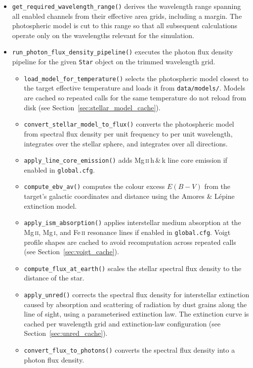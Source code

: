\noindent
\begin{itemize}
    \item \texttt{get\_required\_wavelength\_range()} derives the wavelength range spanning all enabled channels from their effective area grids, including a margin. The photospheric model is cut to this range so that all subsequent calculations operate only on the wavelengths relevant for the simulation.

    \item \texttt{run\_photon\_flux\_density\_pipeline()} executes the photon flux density pipeline for the given \texttt{Star} object on the trimmed wavelength grid.
          \begin{itemize}
              \item \texttt{load\_model\_for\_temperature()} selects the photospheric model closest to the target effective temperature and loads it from \texttt{data/models/}. Models are cached so repeated calls for the same temperature do not reload from disk (see Section~\ref{sec:stellar_model_cache}).
              \item \texttt{convert\_stellar\_model\_to\_flux()} converts the photospheric model from spectral flux density per unit frequency to per unit wavelength, integrates over the stellar sphere, and integrates over all directions.
              \item \texttt{apply\_line\_core\_emission()} adds Mg\,\textsc{ii}\,h\,\&\,k line core emission if enabled in \texttt{global.cfg}.
              \item \texttt{compute\_ebv\_av()} computes the colour excess $E(B-V)$ from the target's galactic coordinates and distance using the Amores \& Lépine extinction model.
              \item \texttt{apply\_ism\_absorption()} applies interstellar medium absorption at the Mg\,\textsc{ii}, Mg\,\textsc{i}, and Fe\,\textsc{ii} resonance lines if enabled in \texttt{global.cfg}. Voigt profile shapes are cached to avoid recomputation across repeated calls (see Section~\ref{sec:voigt_cache}).
              \item \texttt{compute\_flux\_at\_earth()} scales the stellar spectral flux density to the distance of the star.
              \item \texttt{apply\_unred()} corrects the spectral flux density for interstellar extinction caused by absorption and scattering of radiation by dust grains along the line of sight, using a parameterised extinction law. The extinction curve is cached per wavelength grid and extinction-law configuration (see Section~\ref{sec:unred_cache}).
              \item \texttt{convert\_flux\_to\_photons()} converts the spectral flux density into a photon flux density.
          \end{itemize}
\end{itemize}

